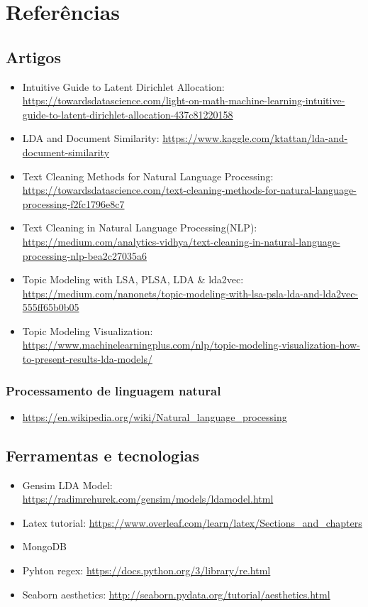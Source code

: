 \section{Referências}

\subsection{Artigos}

\begin{itemize}
    \item Intuitive Guide to Latent Dirichlet Allocation: \url{https://towardsdatascience.com/light-on-math-machine-learning-intuitive-guide-to-latent-dirichlet-allocation-437c81220158}
    \item LDA and Document Similarity: \url{https://www.kaggle.com/ktattan/lda-and-document-similarity}
    \item Text Cleaning Methods for Natural Language Processing: \url{https://towardsdatascience.com/text-cleaning-methods-for-natural-language-processing-f2fc1796e8c7}
    \item Text Cleaning in Natural Language Processing(NLP): \url{https://medium.com/analytics-vidhya/text-cleaning-in-natural-language-processing-nlp-bea2c27035a6}
    \item Topic Modeling with LSA, PLSA, LDA \& lda2vec: \url{https://medium.com/nanonets/topic-modeling-with-lsa-psla-lda-and-lda2vec-555ff65b0b05}
    \item Topic Modeling Visualization: \url{https://www.machinelearningplus.com/nlp/topic-modeling-visualization-how-to-present-results-lda-models/}
\end{itemize}

\subsubsection{Processamento de linguagem natural}

\begin{itemize}
    \item \url{https://en.wikipedia.org/wiki/Natural_language_processing}
\end{itemize}

\subsection{Ferramentas e tecnologias}

\begin{itemize}
    \item Gensim LDA Model: \url{https://radimrehurek.com/gensim/models/ldamodel.html}
    \item Latex tutorial: \url{https://www.overleaf.com/learn/latex/Sections\_and\_chapters}
    \item MongoDB
    \item Pyhton regex: \url{https://docs.python.org/3/library/re.html}
    \item Seaborn aesthetics: \url{http://seaborn.pydata.org/tutorial/aesthetics.html}
\end{itemize}